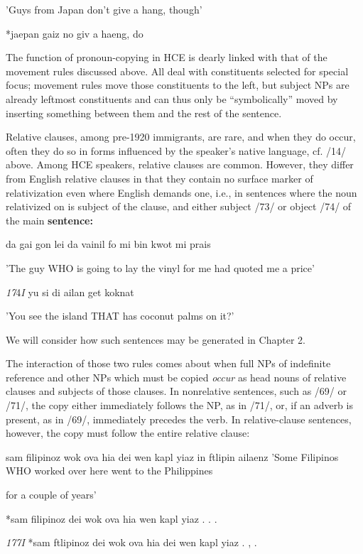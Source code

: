 'Guys from Japan don't give a hang, though'

\ea\label{ex:72}
*jaepan gaiz no giv a haeng, do
\glt
\z

The function of pronoun-copying in HCE is dearly linked with that of the movement rules discussed above. All deal with constituents selected for special focus; movement rules move those constituents to the left, but subject NPs are already leftmost constituents and can thus only be ``symbolically'' moved by inserting something between them and the rest of the sentence.

Relative clauses, among pre-1920 immigrants, are rare, and when they do occur, often they do so in forms influenced by the speaker's native language, cf. /14/ above. Among HCE speakers, relative clauses are common. However, they differ from English relative clauses in that they contain no surface marker of relativization even where English demands one, i.e., in sentences where the noun relativized on is sub\-ject of the clause, and either subject /73/ or object /74/ of the main \textbf{sentence:} 

\ea\label{ex:73}
da gai gon lei da vainil fo mi bin kwot mi prais
\glt
\z

'The guy WHO is going to lay the vinyl for me had quoted me a price'

\textit{17}4\textit{I }yu si di ailan get koknat

'You see the island THAT has coconut palms on it?'

We will consider how such sentences may be generated in Chapter 2.

The interaction of those two rules comes about when full NPs of indefinite reference and other NPs which must be copied \textit{occur }as head nouns of relative clauses and subjects of those clauses. In non\-relative sentences, such as /69/ or /71/, the copy either immediately follows the NP, as in /71/, or, if an adverb is present, as in /69/, immediately precedes the verb. In relative-clause sentences, however, the copy must follow the entire relative clause:

\ea\label{ex:75}
sam filipinoz wok ova hia dei wen kapl yiaz in ftlipin ailaenz 'Some Filipinos WHO worked over here went to the Philippines
\glt
\z

for a couple of years'

\ea\label{ex:76}
*sam filipinoz dei wok ova hia wen kapl yiaz . . .
\glt
\z

\textit{177I }*sam ftlipinoz dei wok ova hia dei wen kapl yiaz . , .

